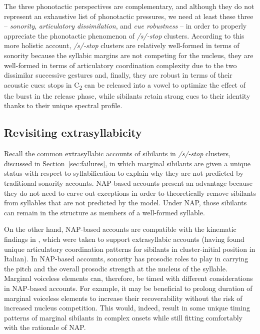 The three phonotactic perspectives are complementary, and although they do not represent an exhaustive list of phonotactic pressures, we need at least these three -- \emph{sonority}, \emph{articulatory dissimilation}, and \emph{cue robustness} -- in order to properly appreciate the phonotactic phenomenon of \emph{/s/-stop} clusters. According to this more holistic account, \emph{/s/-stop} clusters are relatively well-formed in terms of sonority because the syllabic margins are not competing for the nucleus, they are well-formed in terms of articulatory coordination complexity due to the two dissimilar successive gestures
and, finally, they are robust in terms of their acoustic cues:
stops in C\textsubscript{2} can be released into a vowel to optimize the effect of the burst in the release phase, while sibilants retain strong cues to their identity thanks to their unique spectral profile.

\subsection{Revisiting extrasyllabicity}\label{revisiting-extrasyllabicity}

Recall the common extrasyllabic accounts of sibilants in \emph{/s/-stop} clusters, discussed in Section~\ref{sec:failures}, in which marginal sibilants are given a unique status with respect to syllabification to explain why they are not predicted by traditional sonority accounts. NAP-based accounts present an advantage because they do not need to carve out exceptions in order to theoretically remove sibilants from syllables that are not predicted by the model. Under NAP, those sibilants can remain in the structure as members of a well-formed syllable.

On the other hand, NAP-based accounts are compatible with the kinematic findings in \citet{hermes2013phonologysk}, which were taken to support extrasyllabic accounts (having found unique articulatory coordination patterns for sibilants in cluster-initial position in Italian).
In NAP-based accounts, sonority has prosodic roles to play in carrying the pitch and the overall prosodic strength at the nucleus of the syllable. Marginal voiceless elements can, therefore, be timed with different considerations in NAP-based accounts. 
For example, it may be beneficial to prolong duration of marginal voiceless elements to increase their recoverability without the risk of increased nucleus competition. 
This would, indeed, result in some unique timing patterns of marginal sibilants in complex onsets while still fitting comfortably with the rationale of NAP.


